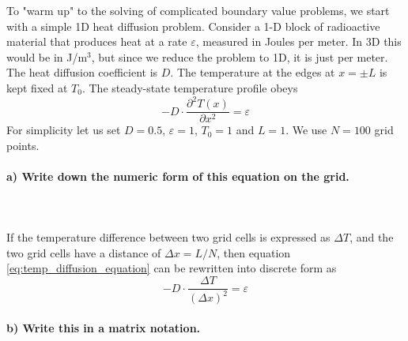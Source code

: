 To "warm up" to the solving of complicated boundary value problems, we 
start with a simple 1D heat diffusion problem. Consider a 1-D block of 
radioactive material that produces heat at a rate $\varepsilon$, 
measured in Joules per meter. In 3D this would be in J/m$^3$, but 
since we reduce the problem to 1D, it is just per meter. The heat 
diffusion coefficient is $D$. The temperature at the edges at $x=\pm L$ 
is kept fixed at $T_0$. The steady-state temperature profile obeys
\begin{equation}
    -D\cdot\frac{\partial^2T(x)}{\partial x^2}=\varepsilon
    \label{eq:temp_diffusion_equation}
\end{equation}
For simplicity let us set $D=0.5$, $\varepsilon=1$, $T_0=1$ and $L=1$. 
We use $N=100$ grid points.

\paragraph{
    a) Write down the numeric form of this equation on the grid.
} \ \\
    \\
    If the temperature difference between two grid cells is expressed as 
    $\Delta T$, and the two grid cells have a distance of 
    $\Delta x=L/N$, then equation 
    \ref{eq:temp_diffusion_equation} can be rewritten into discrete 
    form as
    \begin{equation}
        -D\cdot\frac{\Delta T}{(\Delta x)^2}=\varepsilon
    \end{equation}

\paragraph{
    b) Write this in a matrix notation.
} \ \\
    \\

